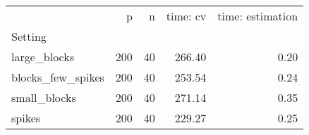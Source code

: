 \begin{tabular}{lrrrr}
\toprule
{} &    p &   n &  time: cv &  time: estimation \\
Setting           &      &     &           &                   \\
\midrule
large\_blocks      &  200 &  40 &    266.40 &              0.20 \\
blocks\_few\_spikes &  200 &  40 &    253.54 &              0.24 \\
small\_blocks      &  200 &  40 &    271.14 &              0.35 \\
spikes            &  200 &  40 &    229.27 &              0.25 \\
\bottomrule
\end{tabular}

